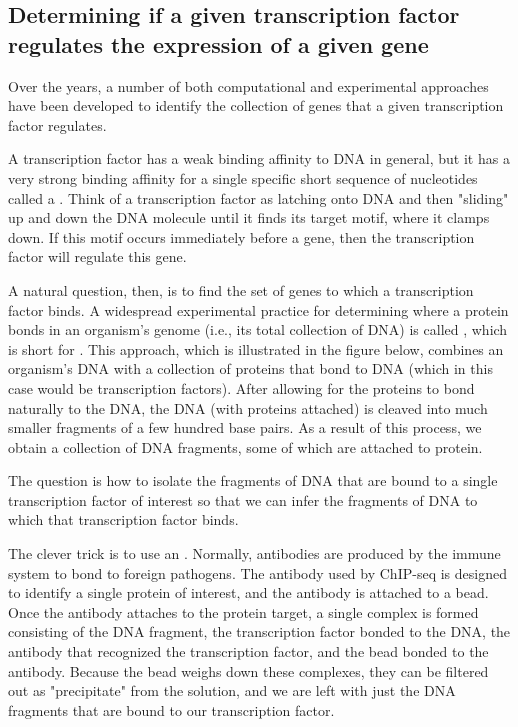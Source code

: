 \FloatBarrier
{}
\subsection{Determining if a given transcription factor regulates the expression of a given gene}

Over the years, a number of both computational and experimental approaches have been developed to identify the collection of genes that a given transcription factor regulates.

A transcription factor has a weak binding affinity to DNA in general, but it has a very strong binding affinity for a single specific short sequence of nucleotides called a . Think of a transcription factor as latching onto DNA and then "sliding" up and down the DNA molecule until it finds its target motif, where it clamps down. If this motif occurs immediately before a gene, then the transcription factor will regulate this gene.

A natural question, then, is to find the set of genes to which a transcription factor binds. A widespread experimental practice for determining where a protein bonds in an organism's genome (i.e., its total collection of DNA) is called , which is short for . This approach, which is illustrated in the figure below, combines an organism's DNA with a collection of proteins that bond to DNA (which in this case would be transcription factors). After allowing for the proteins to bond naturally to the DNA, the DNA (with proteins attached) is cleaved into much smaller fragments of a few hundred base pairs. As a result of this process, we obtain a collection of DNA fragments, some of which are attached to protein.

The question is how to isolate the fragments of DNA that are bound to a single transcription factor of interest so that we can infer the fragments of DNA to which that transcription factor binds.

The clever trick is to use an . Normally, antibodies are produced by the immune system to bond to foreign pathogens. The antibody used by ChIP-seq is designed to identify a single protein of interest, and the antibody is attached to a bead. Once the antibody attaches to the protein target, a single complex is formed consisting of the DNA fragment, the transcription factor bonded to the DNA, the antibody that recognized the transcription factor, and the bead bonded to the antibody. Because the bead weighs down these complexes, they can be filtered out as "precipitate" from the solution, and we are left with just the DNA fragments that are bound to our transcription factor.

